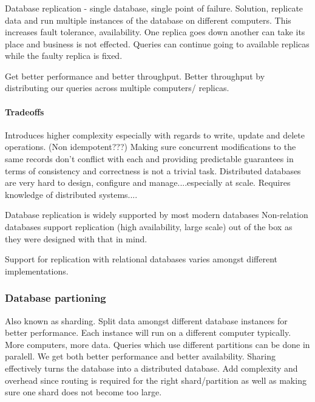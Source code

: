 \documentclass[a4paper, 11pt]{book}
\begin{document}
    \subsubsection{}
    Database replication - single database, single point of failure.
    Solution, replicate data and run multiple instances of the database on different computers.
    This increases fault tolerance, availability.
    One replica goes down another can take its place and business is not effected.
    Queries can continue going to available replicas while the faulty replica is fixed.

    Get better performance and better throughput.
    Better throughput by distributing our queries across multiple computers/ replicas.

    \paragraph{Tradeoffs}
    Introduces higher complexity especially with regards to write, update and delete operations.
    (Non idempotent???)
    Making sure concurrent modifications to the same records don't conflict with each and providing predictable guarantees in terms of consistency and correctness is not a trivial task.
    Distributed databases are very hard to design, configure and manage....especially at scale.
    Requires knowledge of distributed systems....

    Database replication is widely supported by most modern databases
    Non-relation databases support replication (high availability, large scale) out of the box as they were designed with that in mind.

    Support for replication with relational databases varies amongst different implementations.

    \subsubsection{Database partioning}
    Also known as sharding.
    Split data amongst different database instances for better performance.
    Each instance will run on a different computer typically.
    More computers, more data.
    Queries which use different partitions can be done in paralell.
    We get both better performance and better availability.
    Sharing effectively turns the database into a distributed database.
    Add complexity and overhead since routing is required for the right shard/partition as well as making sure one shard does not become too large.
\end{document}
